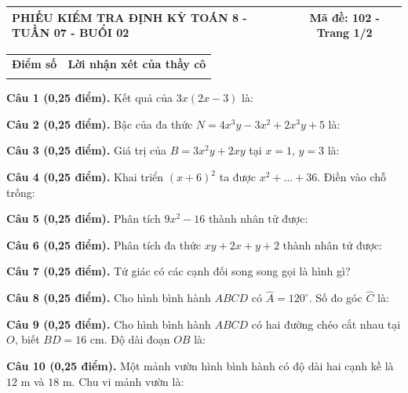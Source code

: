 \documentclass[12pt,a4paper]{article}
\begin{document}
\newpage
\noindent
\begin{tabularx}{\linewidth}{|X|c|}
\hline
\textbf{PHIẾU KIỂM TRA ĐỊNH KỲ TOÁN 8 - TUẦN 07 - BUỔI 02} & \textbf{Mã đề: 102 - Trang 1/2} \\
\hline
\end{tabularx}

\vspace{1.2mm}

\noindent
\begin{tabularx}{\linewidth}{|p{3.2cm}|X|}
\hline
\centering\textbf{Điểm số} & \centering\textbf{Lời nhận xét của thầy cô} \tabularnewline
\rule{0pt}{1.8cm} & \\
\hline
\end{tabularx}

\vspace{1.2mm}

\noindent\textbf{Câu 1 (0,25 điểm).} Kết quả của $3x(2x - 3)$ là: \par\vspace{0.3mm}
\noindent\textbf{Câu 2 (0,25 điểm).} Bậc của đa thức $N = 4x^3 y - 3x^2 + 2x^3 y + 5$ là: \par\vspace{0.3mm}
\noindent\textbf{Câu 3 (0,25 điểm).} Giá trị của $B = 3x^2 y + 2xy$ tại $x = 1$, $y = 3$ là: \par\vspace{0.3mm}
\noindent\textbf{Câu 4 (0,25 điểm).} Khai triển $(x + 6)^2$ ta được $x^2 + \ldots + 36$. Điền vào chỗ trống: \par\vspace{0.3mm}
\noindent\textbf{Câu 5 (0,25 điểm).} Phân tích $9x^2 - 16$ thành nhân tử được: \par\vspace{0.3mm}
\noindent\textbf{Câu 6 (0,25 điểm).} Phân tích đa thức $xy + 2x + y + 2$ thành nhân tử được: \par\vspace{0.3mm}
\noindent\textbf{Câu 7 (0,25 điểm).} Tứ giác có các cạnh đối song song gọi là hình gì? \par\vspace{0.3mm}
\noindent\textbf{Câu 8 (0,25 điểm).} Cho hình bình hành $ABCD$ có $\widehat{A} = 120^\circ$. Số đo góc $\widehat{C}$ là: \par\vspace{0.3mm}
\noindent\textbf{Câu 9 (0,25 điểm).} Cho hình bình hành $ABCD$ có hai đường chéo cắt nhau tại $O$, biết $BD = 16\text{ cm}$. Độ dài đoạn $OB$ là: \par\vspace{0.3mm}
\noindent\textbf{Câu 10 (0,25 điểm).} Một mảnh vườn hình bình hành có độ dài hai cạnh kề là $12\text{ m}$ và $18\text{ m}$. Chu vi mảnh vườn là: \par\vspace{0.3mm}
\end{document}
